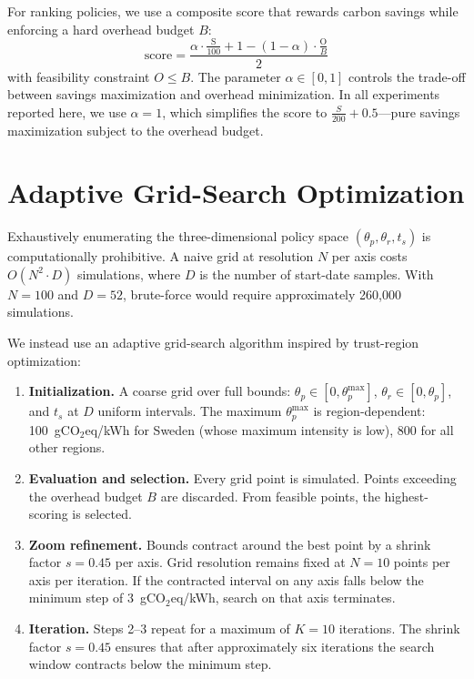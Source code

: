 For ranking policies, we use a composite score that rewards carbon savings
while enforcing a hard overhead budget $B$:
\[
\text{score} = \frac{
  \alpha \cdot \frac{\text{S}}{100}
  + 1 - (1-\alpha) \cdot \frac{\text{O}}{B}
}{2}
\]
with feasibility constraint $O \le B$.  The
parameter $\alpha \in [0,1]$ controls the trade-off between savings
maximization and overhead minimization.  In all experiments reported here, we
use $\alpha = 1$, which simplifies the score to $\frac{S}{200} + 0.5$---pure savings maximization subject to
the overhead budget.

\section{Adaptive Grid-Search Optimization}
\label{sec:optimization}

Exhaustively enumerating the three-dimensional policy space $(\theta_p,
\theta_r, t_s)$ is computationally prohibitive.  A naive grid at resolution
$N$ per axis costs $O(N^2 \cdot D)$ simulations, where $D$ is the number of
start-date samples.  With $N=100$ and $D=52$, brute-force would require
approximately 260,000 simulations.

We instead use an adaptive grid-search algorithm inspired by trust-region
optimization:
\begin{enumerate}
  \item \textbf{Initialization.} A coarse grid over full bounds:
    $\theta_p \in [0, \theta_p^{\max}]$, $\theta_r \in [0, \theta_p]$, and
    $t_s$ at $D$ uniform intervals.  The maximum $\theta_p^{\max}$ is
    region-dependent: 100~gCO$_2$eq/kWh for Sweden (whose maximum intensity is
    low), 800 for all other regions.
  \item \textbf{Evaluation and selection.} Every grid point is simulated.
    Points exceeding the overhead budget $B$ are discarded.  From feasible
    points, the highest-scoring is selected.
  \item \textbf{Zoom refinement.} Bounds contract around the best point by a
    shrink factor $s = 0.45$ per axis.  Grid resolution remains fixed at
    $N = 10$ points per axis per iteration.  If the contracted interval on any
    axis falls below the minimum step of $3$~gCO$_2$eq/kWh, search on that
    axis terminates.
  \item \textbf{Iteration.} Steps 2--3 repeat for a maximum of $K = 10$
    iterations.  The shrink factor $s = 0.45$ ensures that after approximately
    six iterations the search window contracts below the minimum step.
\end{enumerate}

